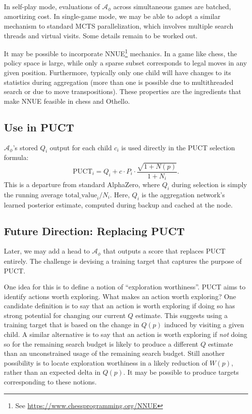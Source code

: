 \documentclass[11pt]{article}
\begin{document}
In self-play mode, evaluations of $\mathcal{A}_\phi$ across simultaneous games
are batched, amortizing cost. In single-game mode, we may be able to adopt a
similar mechanism to standard MCTS parallelization, which involves multiple
search threads and virtual visits. Some details remain to be worked out.

It may be possible to incorporate
NNUE\footnote{See \url{https://www.chessprogramming.org/NNUE}}
mechanics. In a game like chess, the policy space is large, while only a sparse
subset corresponds to legal moves in any given position. Furthermore, typically
only one child will have changes to its statistics during aggregation (more than
one is possible due to multithreaded search or due to move transpositions).
These properties are the ingredients that make NNUE feasible in chess and
Othello.

\subsection{Use in PUCT}
\label{sec:puct}

$\mathcal{A}_\phi$'s stored $Q_i$ output for each child $c_i$ is used
directly in the PUCT selection formula:
\[
  \text{PUCT}_i = Q_i + c \cdot P_i \cdot \frac{\sqrt{1 + N(p)}}{1 + N_i}.
\]
This is a departure from standard AlphaZero, where $Q_i$ during selection is
simply the running average $\text{total\_value}_i / N_i$. Here, $Q_i$ is the
aggregation network's learned posterior estimate, computed during backup and
cached at the node.

\subsection{Future Direction: Replacing PUCT}

Later, we may add a head to $\mathcal{A}_\phi$ that outputs a score that
replaces PUCT entirely. The challenge is devising a training target that
captures the purpose of PUCT.

One idea for this is to define a notion of ``exploration worthiness''.
PUCT aims to identify actions worth exploring. What makes an action
worth exploring? One candidate definition is to say that an action is
worth exploring if doing so has strong potential for changing our current $Q$
estimate. This suggests using a training target that is based on the
change in $Q(p)$ induced by visiting a given child. A similar alternative 
is to say that an action is worth exploring if \textit{not} doing so for
the remaining search budget is likely to produce a different $Q$
estimate than an unconstrained usage of the remaining search budget.
Still another possibility is to locate exploration worthiness in a likely
reduction of $W(p)$, rather than an expected delta in $Q(p)$. 
It may be possible to produce targets corresponding
to these notions.
\end{document}
